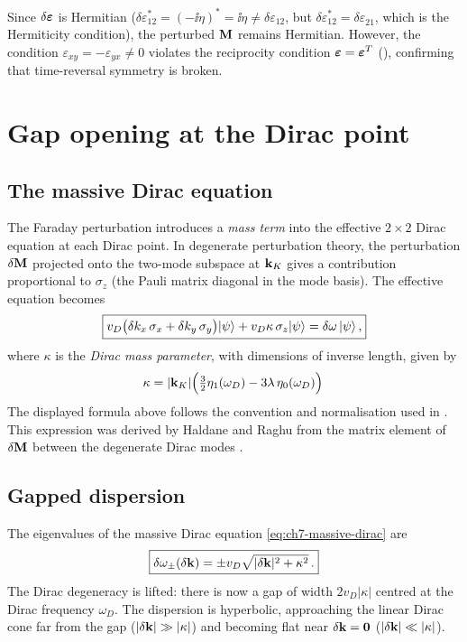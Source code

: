 Since $\delta\boldsymbol{\varepsilon}$ is Hermitian
($\delta\varepsilon_{12}^*=(-\ii\eta)^*=\ii\eta
\neq\delta\varepsilon_{12}$, but
$\delta\varepsilon_{12}^*=\delta\varepsilon_{21}^{\phantom{*}}$,
which is the Hermiticity condition), the perturbed $\mathbf{M}$ remains
Hermitian.
However, the condition $\varepsilon_{xy}=-\varepsilon_{yx}\neq 0$
violates the reciprocity condition $\boldsymbol{\varepsilon}=\boldsymbol{\varepsilon}^T$
(), confirming that time-reversal symmetry
is broken.

\section{Gap opening at the Dirac point}
\label{sec:ch7-gap}

\subsection{The massive Dirac equation}
\label{sec:ch7-massive-dirac}

The Faraday perturbation introduces a \emph{mass term} into the
effective $2\times 2$ Dirac equation at each Dirac point.  In
degenerate perturbation theory, the perturbation $\delta\mathbf{M}$
projected onto the two-mode subspace at $\mathbf{k}_K$ gives a contribution
proportional to $\sigma_z$ (the Pauli matrix diagonal in the mode
basis).  The effective equation becomes
\begin{equation}\label{eq:ch7-massive-dirac}
  \boxed{%
  v_D\bigl(\delta k_x\,\sigma_x + \delta k_y\,\sigma_y\bigr)|\psi\rangle
  + v_D\kappa\,\sigma_z|\psi\rangle
  = \delta\omega\,|\psi\rangle\,,}
\end{equation}
where $\kappa$ is the \emph{Dirac mass parameter}, with dimensions of
inverse length, given by
\begin{equation}\label{eq:ch7-kappa}
  \kappa = |\mathbf{k}_K|\Bigl(
    \tfrac{3}{2}\eta_1(\omega_D) - 3\lambda\,\eta_0(\omega_D)
  \Bigr)\,
\end{equation}
The displayed formula above follows the convention and normalisation used in \cite{raghu2008analogs}.
This expression was derived by Haldane and Raghu from the matrix element
of $\delta\mathbf{M}$ between the degenerate Dirac modes
\cite{haldane2008possible}.

\subsection{Gapped dispersion}
\label{sec:ch7-gapped-dispersion}

The eigenvalues of the massive Dirac equation \eqref{eq:ch7-massive-dirac}
are
\begin{equation}\label{eq:ch7-gapped-disp}
  \boxed{%
  \delta\omega_\pm(\delta\kvec)
  = \pm v_D\sqrt{|\delta\kvec|^2 + \kappa^2}\,.}
\end{equation}
The Dirac degeneracy is lifted: there is now a gap of width
$2v_D|\kappa|$ centred at the Dirac frequency $\omega_D$.  The
dispersion is hyperbolic, approaching the linear Dirac cone far from
the gap ($|\delta\mathbf{k}|\gg|\kappa|$) and becoming flat near
$\delta\mathbf{k}=\mathbf{0}$ ($|\delta\mathbf{k}|\ll|\kappa|$).

